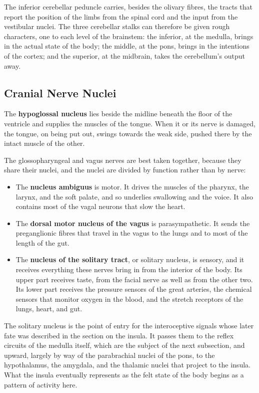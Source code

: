 \documentclass[11pt]{article}
\begin{document}
The inferior cerebellar peduncle carries, besides the olivary fibres, the tracts that report the position of the limbs from the spinal cord and the input from the vestibular nuclei. The three cerebellar stalks can therefore be given rough characters, one to each level of the brainstem: the inferior, at the medulla, brings in the actual state of the body; the middle, at the pons, brings in the intentions of the cortex; and the superior, at the midbrain, takes the cerebellum's output away.

\subsection{Cranial Nerve Nuclei}

The \textbf{hypoglossal nucleus} lies beside the midline beneath the floor of the ventricle and supplies the muscles of the tongue. When it or its nerve is damaged, the tongue, on being put out, swings towards the weak side, pushed there by the intact muscle of the other.

The glossopharyngeal and vagus nerves are best taken together, because they share their nuclei, and the nuclei are divided by function rather than by nerve:

\begin{itemize}
    \item The \textbf{nucleus ambiguus} is motor. It drives the muscles of the pharynx, the larynx, and the soft palate, and so underlies swallowing and the voice. It also contains most of the vagal neurons that slow the heart.
    \item The \textbf{dorsal motor nucleus of the vagus} is parasympathetic. It sends the preganglionic fibres that travel in the vagus to the lungs and to most of the length of the gut.
    \item The \textbf{nucleus of the solitary tract}, or solitary nucleus, is sensory, and it receives everything these nerves bring in from the interior of the body. Its upper part receives taste, from the facial nerve as well as from the other two. Its lower part receives the pressure sensors of the great arteries, the chemical sensors that monitor oxygen in the blood, and the stretch receptors of the lungs, heart, and gut.
\end{itemize}

The solitary nucleus is the point of entry for the interoceptive signals whose later fate was described in the section on the insula. It passes them to the reflex circuits of the medulla itself, which are the subject of the next subsection, and upward, largely by way of the parabrachial nuclei of the pons, to the hypothalamus, the amygdala, and the thalamic nuclei that project to the insula. What the insula eventually represents as the felt state of the body begins as a pattern of activity here.
\end{document}
